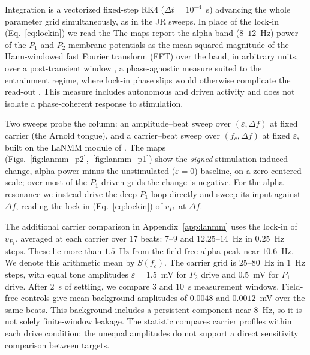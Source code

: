 \documentclass[11pt,a4paper]{article}
\providecommand{\DIFaddtex}[1]{{\protect\color{blue} \sf #1}} %
\providecommand{\DIFdeltex}[1]{{\protect\color{red} \scriptsize #1}} %
\providecommand{\DIFaddbegin}{} %
\providecommand{\DIFaddend}{} %
\providecommand{\DIFdelbegin}{} %
\providecommand{\DIFdelend}{} %
\providecommand{\DIFadd}[1]{\texorpdfstring{\DIFaddtex{#1}}{#1}} %
\providecommand{\DIFdel}[1]{\texorpdfstring{\DIFdeltex{#1}}{}} %
\begin{document}
Integration is a vectorized fixed-step RK4
($\Delta t=10^{-4}$~s) advancing the whole parameter grid simultaneously, as in the JR
sweeps. \DIFdelbegin \DIFdel{In place of the
lock-in (Eq.~\eqref{eq:lockin}) we read the
}\DIFdelend \DIFaddbegin \DIFadd{The maps report the
}\DIFaddend alpha-band ($8$--$12$~Hz) power of the $P_1$ and $P_2$ membrane potentials as the mean
squared magnitude of the Hann-windowed fast Fourier transform (FFT) over the band, in arbitrary units, over a
post-transient window\DIFdelbegin \DIFdel{, a phase-agnostic measure suited to the entrainment regime, where
lock-in phase slips would otherwise complicate the read-out}\DIFdelend \DIFaddbegin \DIFadd{. This measure includes autonomous and driven activity and
does not isolate a phase-coherent response to stimulation}\DIFaddend .

Two sweeps probe the column: an amplitude--beat sweep over
$(\varepsilon,\Delta f)$ at fixed carrier\DIFdelbegin \DIFdel{(the Arnold tongue)}\DIFdelend , and a carrier--beat sweep
over $(f_c,\Delta f)$ at fixed $\varepsilon$, built on the LaNMM module of
\cite{ruffini2025cfc}. The maps
(Figs.~\ref{fig:lanmm_p2},~\ref{fig:lanmm_p1}) show the \emph{signed} stimulation-induced
change, alpha power minus the unstimulated ($\varepsilon=0$) baseline, on a zero-centered
scale; over most of the $P_1$-driven grids the change is negative. For the
alpha resonance we instead drive the deep $P_1$ loop directly and sweep its input against
$\Delta f$, reading the lock-in (Eq.~\eqref{eq:lockin}) of $v_{P_1}$ at $\Delta f$.

\DIFaddbegin \DIFadd{The additional carrier comparison in Appendix~\ref{app:lanmm} uses the lock-in
of $v_{P_1}$, averaged at each carrier over 17 beats: $7$--$9$ and
$12.25$--$14$~Hz in $0.25$~Hz steps. These lie more than $1.5$~Hz from the
field-free alpha peak near $10.6$~Hz. We denote this arithmetic mean by $S(f_c)$.
The carrier grid is $25$--$80$~Hz in $1$~Hz steps, with equal tone amplitudes
$\varepsilon=1.5$~mV for $P_2$ drive and $0.5$~mV for $P_1$ drive. After $2$~s
of settling, we compare $3$ and $10$~s measurement windows. Field-free controls
give mean background amplitudes of $0.0048$ and $0.0012$~mV over the same beats.
This background includes a persistent component near $8$~Hz, so it is not solely
finite-window leakage. The statistic compares carrier profiles within each drive
condition; the unequal amplitudes do not support a direct sensitivity comparison
between targets.
}
\end{document}
